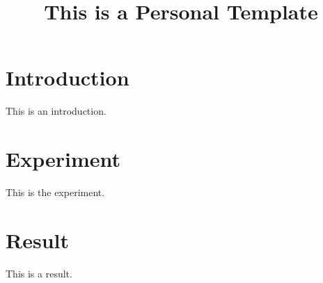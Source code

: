 \documentclass{article}
\begin{document}
\title{This is a Personal \LaTeXe{} Template}
\maketitle

\section{Introduction}
This is an introduction.
\section{Experiment}
This is the experiment.
\section{Result}
This is a result. 
\end{document}
